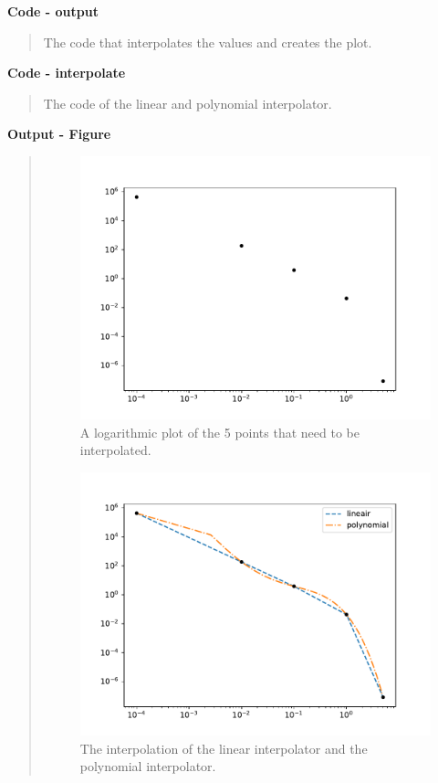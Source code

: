 \textbf{Code - output}
\begin{quote}
The code that interpolates the values and creates the plot.

\end{quote}

\textbf{Code - interpolate}
\begin{quote}
The code of the linear and polynomial interpolator.

\end{quote}
\newpage

\textbf{Output - Figure}
\begin{quote}
\begin{figure}[!ht]
\centering
\includegraphics[scale=0.7]{plots/points.pdf}
\caption{A logarithmic plot of the 5 points that need to be interpolated.}
\end{figure}

\begin{figure}[!ht]
\centering
\includegraphics[scale=0.7]{plots/interpolate.pdf}
\caption{The interpolation of the linear interpolator and the polynomial interpolator.}
\end{figure}
\end{quote}
\newpage


 









